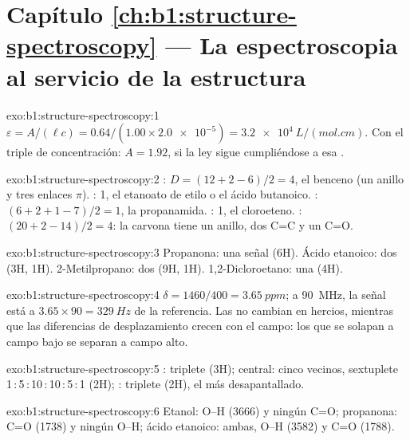 \section*{Capítulo \ref{ch:b1:structure-spectroscopy} --- La espectroscopia al servicio de la estructura}

\begin{solution}{exo:b1:structure-spectroscopy:1}
$\varepsilon = A/(\ell c) = 0.64/(1.00 \times \num{2.0e-5}) =
\qty{3.2e4}{L/(mol.cm)}$. Con el triple de concentración: $A = 1.92$, si
la ley sigue cumpliéndose a esa .
\end{solution}

\begin{solution}{exo:b1:structure-spectroscopy:2}
: $D = (12 + 2 - 6)/2 = 4$, el benceno (un anillo y tres enlaces
$\pi$). : 1, el etanoato de etilo o el ácido butanoico.
: $(6 + 2 + 1
- 7)/2 = 1$, la propanamida. : 1, el cloroeteno. :
$(20 + 2 - 14)/2 = 4$: la carvona tiene un anillo, dos C=C y un C=O.
\end{solution}

\begin{solution}{exo:b1:structure-spectroscopy:3}
Propanona: una señal (6H). Ácido etanoico: dos (3H, 1H). 2-Metilpropano:
dos (9H, 1H). 1,2-Dicloroetano: una (4H).
\end{solution}

\begin{solution}{exo:b1:structure-spectroscopy:4}
$\delta = 1460/400 = \qty{3.65}{ppm}$; a \qty{90}{MHz}, la señal está a
$3.65 \times 90 = \qty{329}{Hz}$ de la referencia. Las  no cambian en hercios, mientras que las diferencias de
desplazamiento crecen con el campo: los  que se solapan a
campo bajo se separan a campo alto.
\end{solution}

\begin{solution}{exo:b1:structure-spectroscopy:5}
: triplete (3H);  central: cinco vecinos, sextuplete
1\,:\,5\,:\,10\,:\,10\,:\,5\,:\,1 (2H); : triplete (2H), el más
desapantallado.
\end{solution}

\begin{solution}{exo:b1:structure-spectroscopy:6}
Etanol: O--H (3666) y ningún C=O; propanona: C=O (1738) y ningún O--H;
ácido etanoico: ambas, O--H (3582) y C=O (1788).
\end{solution}

